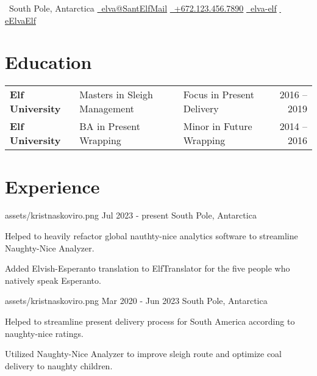 \documentclass[10pt]{engxeniero}
\author{Elva the Elf}
\begin{document}
\placelastupdated
\begin{center}
  \name %

  \vspace{15 pt}
  \info %
  {\faGlobe \, South Pole, Antarctica}
  {\href{mailto:elva@santelfmail.com}{\faEnvelopeO \, elva@SantElfMail}}
  {\href{tel:+672-123-456-7890}{\faMobilePhone \, +672.123.456.7890}}
  {\href{https://linkedin.com/in/elva-elf}{\faLinkedinSquare \, elva-elf}}
  {\href{https://github.com/eElvaElf}{\faGithub \, eElvaElf}}
  \par
\end{center}

\section{Education}

\begin{tabularx}{\linewidth}{@{}llXr@{}}

  \textbf{Elf University}
    & Masters in Sleigh Management
    & Focus in Present Delivery
    & 2016 – 2019
  \\

  \textbf{Elf University}
    & BA in Present Wrapping
    & Minor in Future Wrapping
    & 2014 – 2016
  \\

\end{tabularx}

\section{Experience}

  {}
  {assets/kristnaskoviro.png}
  {Jul 2023 - present}
  {South Pole, Antarctica} {
    \item Helped to heavily refactor global nauthty-nice analytics software to
      streamline Naughty-Nice Analyzer.
    \item Added Elvish-Esperanto translation to ElfTranslator for the five
      people who natively speak Esperanto.
  }

  {}
  {assets/kristnaskoviro.png}
  {Mar 2020 - Jun 2023}
  {South Pole, Antarctica} {
    \item Helped to streamline present delivery process for South America
      according to naughty-nice ratings.
    \item Utilized Naughty-Nice Analyzer to improve sleigh route and optimize
      coal delivery to naughty children.
  }
\end{document}
